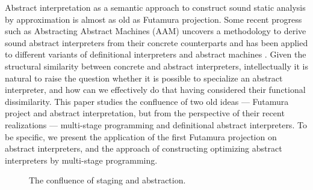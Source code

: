 Abstract interpretation \cite{DBLP:conf/popl/CousotC77} as a semantic approach to construct 
sound static analysis by approximation is almost as old as Futamura projection.
Some recent progress such as Abstracting Abstract Machines (AAM) uncovers a methodology to 
derive sound abstract interpreters from their concrete counterparts and has been applied to 
different variants of definitional interpreters and abstract machines
\cite{DBLP:journals/jfp/HornM12, DBLP:conf/icfp/HornM10, DBLP:journals/pacmpl/DaraisLNH17}.
Given the structural similarity between concrete and abstract interpreters, intellectually 
it is natural to raise the question whether it is possible to specialize an abstract interpreter, and how 
can we effectively do that having considered their functional dissimilarity. 
This paper studies the confluence of two old ideas --- Futamura project and abstract interpretation,
but from the perspective of their recent realizations --- multi-stage programming and definitional
abstract interpreters. To be specific, we present the application of the first Futamura projection
on abstract interpreters, and the approach of constructing optimizing abstract interpreters by 
multi-stage programming.

\begin{figure}[h]
  \caption{The confluence of staging and abstraction.}
  \label{confluence}
\end{figure}

